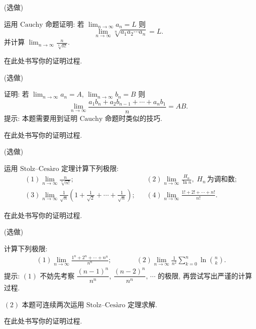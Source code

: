 \documentclass[answers, 10pt]{exam}
\begin{document}
\begin{questions}
	
	 (选做)
	
	运用 $\mathrm{Cauchy}$ 命题证明: 若 $\displaystyle\lim_{n\to\infty} a_n=L$ 则
	$$
	\lim_{n\to\infty} \sqrt[n]{a_1a_2\cdots a_n} = L.
	$$
	并计算
	$
	\displaystyle\lim_{n\to\infty} \frac{n}{\sqrt[n]{n!}}.
	$
	
	\begin{solution}
		在此处书写你的证明过程.
	\end{solution}
	
	 (选做)
	
	证明: 若 $\displaystyle\lim_{n\to\infty} a_n=A$, $\displaystyle\lim_{n\to\infty} b_n=B$ 则
	$$
	\lim_{n\to\infty} \frac{a_1b_n+a_2b_{n-1}+\cdots+a_nb_1}{n} = AB.
	$$
	提示: 本题需要用到证明 $\mathrm{Cauchy}$ 命题时类似的技巧.
	
	\begin{solution}
		在此处书写你的证明过程.
	\end{solution}
	
	 (选做)
	
	运用 $\mathrm{Stolz–Cesàro}$ 定理计算下列极限:
	$$
	\begin{aligned}
		& (1) \lim_{n\to\infty} \frac{n}{\sqrt[n]{n!}};
		&&(2) \lim_{n\to\infty} \frac{H_n}{\ln n},\; H_n\,\text{为调和数}; \\
		& (3) \lim_{n\to\infty} \frac1{\sqrt{n}}\left(1+\frac1{\sqrt2}+\cdots+\frac1{\sqrt{n}}\right);
		&&(4) \lim_{n\to\infty} \frac{1!+2!+\cdots+n!}{n!}.
	\end{aligned}
	$$  \vspace{-5ex}
	\begin{solution}
		在此处书写你的证明过程.
	\end{solution}
	
	 (选做)
	
	计算下列极限:
	$$
	\begin{aligned}
		& (1) \lim_{n\to\infty} \frac{1^n+2^n+\cdots+n^n}{n^n}; \qquad
		&&(2) \lim_{n\to\infty} \frac1{n^2}\sum_{k=0}^{n}\ln\binom{n}{k}. 
	\end{aligned}
	$$
	提示: $(1)$ 不妨先考察 $\dfrac{(n-1)^n}{n^n}$, $\dfrac{(n-2)^n}{n^n},\,\cdots$ 的极限, 再尝试写出严谨的计算过程.
	
	\medskip
	$(2)$ 本题可连续两次运用 $\mathrm{Stolz–Cesàro}$ 定理求解.
	\begin{solution}
		在此处书写你的证明过程.
	\end{solution}
	

\end{questions}
\end{document}
